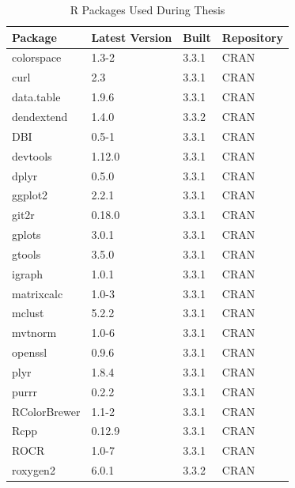 \setlength\LTleft{0pt}
\setlength\LTright{0pt}
\begin{longtable}{@{\extracolsep{\fill}}|llll|@{}}
\caption{R Packages Used During Thesis}
\label{tab:computers_r_packages}
\hline
Package      & Latest Version & Built & Repository      \\ \hline
colorspace   & 1.3-2          & 3.3.1 & CRAN            \\ \hline
curl         & 2.3            & 3.3.1 & CRAN            \\ \hline
data.table   & 1.9.6          & 3.3.1 & CRAN            \\ \hline
dendextend   & 1.4.0          & 3.3.2 & CRAN            \\ \hline
DBI          & 0.5-1          & 3.3.1 & CRAN            \\ \hline
devtools     & 1.12.0         & 3.3.1 & CRAN            \\ \hline
dplyr        & 0.5.0          & 3.3.1 & CRAN            \\ \hline
ggplot2      & 2.2.1          & 3.3.1 & CRAN            \\ \hline
git2r        & 0.18.0         & 3.3.1 & CRAN            \\ \hline
gplots       & 3.0.1          & 3.3.1 & CRAN            \\ \hline
gtools       & 3.5.0          & 3.3.1 & CRAN            \\ \hline
igraph       & 1.0.1          & 3.3.1 & CRAN            \\ \hline
matrixcalc   & 1.0-3          & 3.3.1 & CRAN            \\ \hline
mclust       & 5.2.2          & 3.3.1 & CRAN            \\ \hline
mvtnorm      & 1.0-6          & 3.3.1 & CRAN            \\ \hline
openssl      & 0.9.6          & 3.3.1 & CRAN            \\ \hline
plyr         & 1.8.4          & 3.3.1 & CRAN            \\ \hline
purrr        & 0.2.2          & 3.3.1 & CRAN            \\ \hline
RColorBrewer & 1.1-2          & 3.3.1 & CRAN            \\ \hline
Rcpp         & 0.12.9         & 3.3.1 & CRAN            \\ \hline
ROCR         & 1.0-7          & 3.3.1 & CRAN            \\ \hline
roxygen2     & 6.0.1          & 3.3.2 & CRAN            \\ \hline

\end{longtable}

